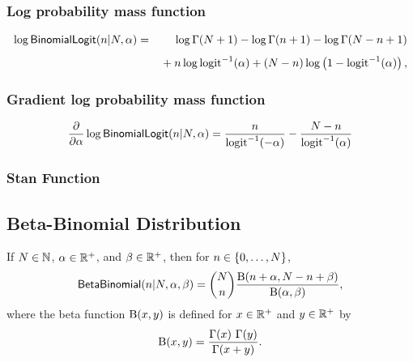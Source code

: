 \subsubsection{Log probability mass function}
\begin{eqnarray*}
\log \mbox{\sf BinomialLogit}(n|N,\alpha)
& = &
\log \Gamma(N+1) - \log \Gamma(n + 1) - \log \Gamma(N- n + 1)
\\[4pt]
& & { } + n \log \mbox{logit}^{-1}(\alpha) + (N - n) \log \left( 1 -
  \mbox{logit}^{-1}(\alpha) \right), 
\end{eqnarray*}
%
\subsubsection{Gradient log probability mass function}
%
\[
\frac{\partial}{\partial \alpha} \log \mbox{\sf BinomialLogit}(n|N,\alpha)
= \frac{n}{\mbox{logit}^{-1}(-\alpha)}
- \frac{N - n}{\mbox{logit}^{-1}(\alpha)}
\]
%
\subsubsection{Stan Function}
%
\begin{description}
%
%
\end{description}


\subsection{Beta-Binomial Distribution}

If $N \in \mathbb{N}$, $\alpha \in \mathbb{R}^+$, and $\beta \in \mathbb{R}^+$,
then for $n \in \{ 0,\ldots,N \}$,
\[
\mbox{\sf BetaBinomial}(n|N,\alpha,\beta)
= 
{N \choose n} \frac{\mbox{B}(n+\alpha, N -n +
  \beta)}{\mbox{B}(\alpha,\beta)},
\]
%
where the beta function $\mbox{B}(x,y)$ is defined for $x \in
\mathbb{R}^+$ and $y \in \mathbb{R}^+$ by
%
\[
\mbox{B}(x,y)
= \frac{\Gamma(x) \ \Gamma(y)}{\Gamma(x + y)}.
\]

\begin{description}
%
%
\end{description}


